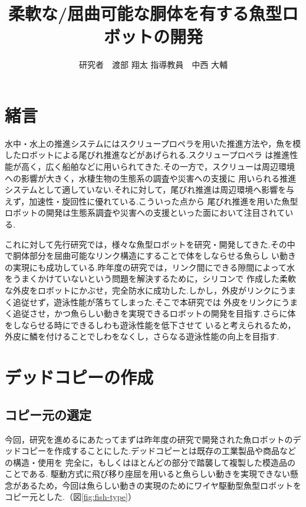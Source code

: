 \documentclass{jarticle}
\begin{document}

\title{
柔軟な/屈曲可能な胴体を有する魚型ロボットの開発
}
\author{
研究者　渡部 翔太\;\;\;
指導教員　中西 大輔
}

\maketitle

\thispagestyle{empty}  %

\section{緒言}

水中・水上の推進システムにはスクリュープロペラを用いた推進方法や，魚を模したロボットによる尾びれ推進などがあげられる\cite{ichi}.スクリュープロペラ
は推進性能が高く，広く船舶などに用いられてきた.その一方で，スクリューは周辺環境への影響が大きく，水棲生物の生態系の調査や災害への支援に
用いられる推進システムとして適していない.それに対して，尾びれ推進は周辺環境へ影響を与えず，加速性・旋回性に優れている.こういった点から
尾びれ推進を用いた魚型ロボットの開発は生態系調査や災害への支援といった面において注目されている\cite{ni}.

これに対して先行研究では，様々な魚型ロボットを研究・開発してきた.その中で胴体部分を屈曲可能なリンク構造にすることで体をしならせる魚らし
い動きの実現にも成功している.昨年度の研究では，リンク間にできる隙間によって水をうまくかけていないという問題を解決するために，シリコンで
作成した柔軟な外皮をロボットにかぶせ，完全防水に成功した\cite{san}.しかし，外皮がリンクにうまく追従せず，遊泳性能が落ちてしまった.そこで本研究では
外皮をリンクにうまく追従させ，かつ魚らしい動きを実現できるロボットの開発を目指す.さらに体をしならせる時にできるしわも遊泳性能を低下させて
いると考えられるため，外皮に鱗を付けることでしわをなくし，さらなる遊泳性能の向上を目指す.

\vspace*{-1mm}
\section{デッドコピーの作成}
\subsection{コピー元の選定}
今回，研究を進めるにあたってまずは昨年度の研究で開発された魚ロボットのデッドコピーを作成することにした.デッドコピーとは既存の工業製品や商品などの構造・使用を
完全に，もしくはほとんどの部分で踏襲して複製した模造品のことである.
駆動方式に飛び移り座屈を用いると魚らしい動きを実現できない懸念があるため，今回は魚らしい動きの実現のためにワイヤ駆動型魚型ロボットをコピー元とした.（図\ref{fig:fish-type}）
\end{document}
